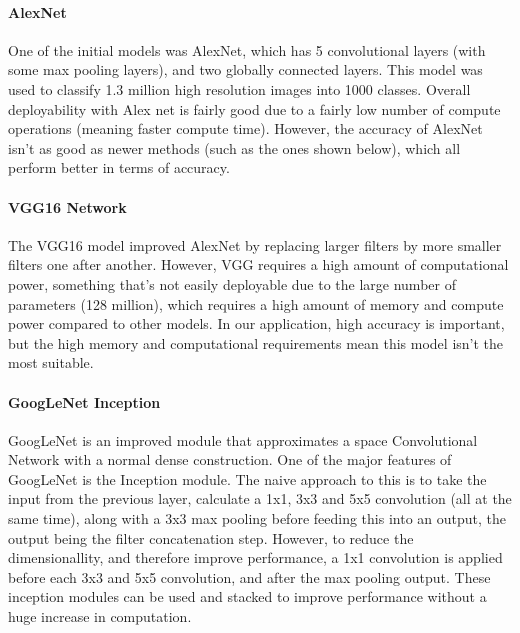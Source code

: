 \documentclass[10pt,a4paper]{article}
\begin{document}
            \paragraph{AlexNet} 
            One of the initial models was AlexNet, which has 5 convolutional layers (with some max pooling layers), and two globally connected layers.
            This model was used to classify 1.3 million high resolution images into 1000 classes. \cite{AlexNet} Overall deployability
            with Alex net is fairly good due to a fairly low number of compute operations (meaning faster compute time). \cite{DeepNeuralNetworkDeployability} However, the accuracy of AlexNet isn't
            as good as newer methods (such as the ones shown below), which all perform better in terms of accuracy. 
            
            \paragraph{VGG16 Network}
            The VGG16 model improved AlexNet by replacing larger filters by more smaller filters one after another.
            However, VGG requires a high amount of computational power, something that's not easily deployable due to
            the large number of parameters (128 million), which requires a high amount of memory and compute power compared
            to other models. \cite{DeepNeuralNetworkDeployability} In our application, high accuracy is important, but the high
            memory and computational requirements mean this model isn't the most suitable.

            \paragraph{GoogLeNet Inception}
            GoogLeNet is an improved module that approximates a space Convolutional Network with a normal
            dense construction. One of the major features of GoogLeNet is the Inception module. The naive approach to this 
            is to take the input from the previous layer, calculate a 1x1, 3x3 and 5x5 convolution (all at the same time), along with
            a 3x3 max pooling before feeding this into an output, the output being the filter concatenation step.
            However, to reduce the dimensionallity, and therefore improve performance, a 1x1 convolution is applied before
            each 3x3 and 5x5 convolution, and after the max pooling output. These inception modules can be used and stacked
            to improve performance without a huge increase in computation. \cite{GoogLeNet} 
    
\end{document}
